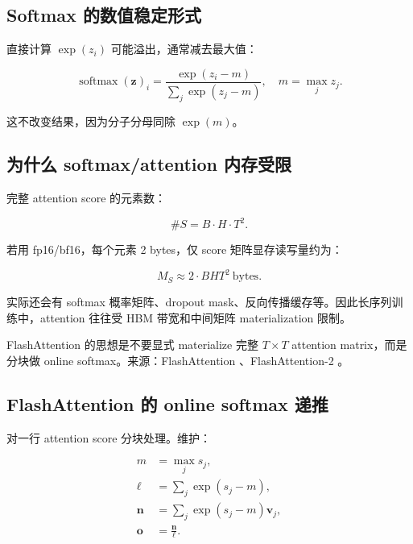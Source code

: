 \documentclass[UTF8,12pt]{ctexart}
\newcommand{\1}{\mathbf{1}}
\newcommand{\softmax}{\operatorname{softmax}}
\begin{document}
\subsection{Softmax 的数值稳定形式}

直接计算 $\exp(z_i)$ 可能溢出，通常减去最大值：

\begin{equation}
\softmax(\bm{z})_i
=\frac{\exp(z_i-m)}{\sum_j \exp(z_j-m)},
\quad
m=\max_j z_j.
\label{eq:stable-softmax}
\end{equation}

这不改变结果，因为分子分母同除 $\exp(m)$。

\subsection{为什么 softmax/attention 内存受限}

完整 attention score 的元素数：

\begin{equation}
\#S = B\cdot H\cdot T^2.
\end{equation}

若用 fp16/bf16，每个元素 2 bytes，仅 score 矩阵显存读写量约为：

\begin{equation}
M_S \approx 2\cdot BHT^2\ \mathrm{bytes}.
\end{equation}

实际还会有 softmax 概率矩阵、dropout mask、反向传播缓存等。因此长序列训练中，attention 往往受 HBM 带宽和中间矩阵 materialization 限制。

FlashAttention 的思想是不要显式 materialize 完整 $T\times T$ attention matrix，而是分块做 online softmax。来源：FlashAttention \cite{dao2022flashattention}、FlashAttention-2 \cite{dao2023flashattention2}。

\subsection{FlashAttention 的 online softmax 递推}

对一行 attention score 分块处理。维护：

\begin{align}
m &= \max_j s_j,\\
\ell &= \sum_j \exp(s_j-m),\\
\bm{n} &= \sum_j \exp(s_j-m)\bm{v}_j,\\
\bm{o} &= \frac{\bm{n}}{\ell}.
\end{align}
\end{document}
